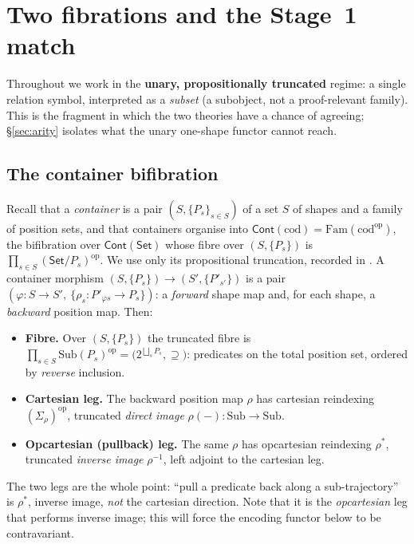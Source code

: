 \documentclass[11pt]{article}
\theoremstyle{definition}
\newcommand{\Set}{\mathsf{Set}}
\newcommand{\Cont}{\mathsf{Cont}}
\newcommand{\Fam}{\mathrm{Fam}}
\newcommand{\Sub}{\mathrm{Sub}}
\newcommand{\cod}{\mathrm{cod}}
\newcommand{\op}{\mathrm{op}}
\begin{document}
\section{Two fibrations and the Stage~1 match}\label{sec:prelim}

Throughout we work in the \textbf{unary, propositionally truncated} regime: a single relation
symbol, interpreted as a \emph{subset} (a subobject, not a proof-relevant family). This is the
fragment in which the two theories have a chance of agreeing; \S\ref{sec:arity} isolates what the
unary one-shape functor cannot reach.

\subsection{The container bifibration}

Recall \cite{ahman-dcont-cat,gambino-kock} that a \emph{container} is a pair $(S,\{P_s\}_{s\in S})$
of a set $S$ of shapes and a family of position sets, and that containers organise into
$\Cont(\cod)=\Fam(\cod^\op)$, the bifibration over $\Cont(\Set)$ whose fibre over $(S,\{P_s\})$ is
$\prod_{s\in S}(\Set/P_s)^\op$. We use only its propositional truncation, recorded in
\cite{macbeth-contcod}. A container morphism $(S,\{P_s\})\to(S',\{P'_{s'}\})$ is a pair
$(\varphi\colon S\to S',\ \{\rho_s\colon P'_{\varphi s}\to P_s\})$: a \emph{forward} shape map and,
for each shape, a \emph{backward} position map. Then:

\begin{itemize}
\item \textbf{Fibre.} Over $(S,\{P_s\})$ the truncated fibre is
$\prod_{s\in S}\Sub(P_s)^\op=\bigl(2^{\bigsqcup_s P_s},\supseteq\bigr)$: predicates on the total
position set, ordered by \emph{reverse} inclusion.
\item \textbf{Cartesian leg.} The backward position map $\rho$ has cartesian reindexing
$(\Sigma_\rho)^\op$, truncated \emph{direct image} $\rho(-)\colon\Sub\to\Sub$.
\item \textbf{Opcartesian (pullback) leg.} The same $\rho$ has opcartesian reindexing $\rho^*$,
truncated \emph{inverse image} $\rho^{-1}$, left adjoint to the cartesian leg.
\end{itemize}

The two legs are the whole point: ``pull a predicate back along a sub-trajectory'' is $\rho^*$,
inverse image, \emph{not} the cartesian direction. Note that it is the \emph{opcartesian} leg that
performs inverse image; this will force the encoding functor below to be contravariant.
\end{document}
